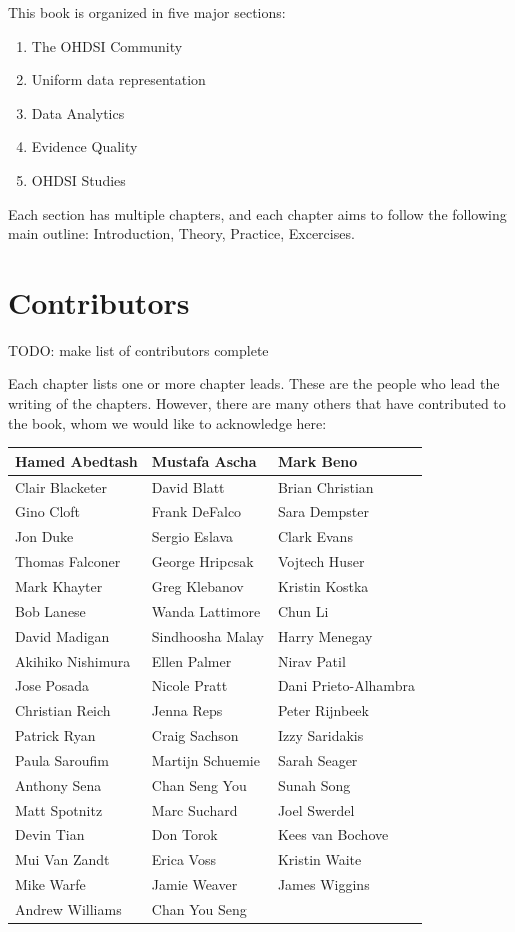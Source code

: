 \documentclass[11pt]{book}
\providecommand{\tightlist}{%
  \setlength{\itemsep}{0pt}\setlength{\parskip}{0pt}}
\theoremstyle{definition}
\theoremstyle{definition}
\theoremstyle{definition}
\theoremstyle{remark}
\begin{document}
This book is organized in five major sections:

\begin{enumerate}
\def\labelenumi{\Roman{enumi})}
\tightlist
\item
  The OHDSI Community
\item
  Uniform data representation
\item
  Data Analytics
\item
  Evidence Quality
\item
  OHDSI Studies
\end{enumerate}

Each section has multiple chapters, and each chapter aims to follow the following main outline: Introduction, Theory, Practice, Excercises.

\hypertarget{contributors}{%
\section*{Contributors}\label{contributors}}

TODO: make list of contributors complete

Each chapter lists one or more chapter leads. These are the people who lead the writing of the chapters. However, there are many others that have contributed to the book, whom we would like to acknowledge here:

\begin{tabular}{l|l|l}
\hline
Hamed Abedtash & Mustafa Ascha & Mark Beno\\
\hline
Clair Blacketer & David Blatt & Brian Christian\\
\hline
Gino Cloft & Frank DeFalco & Sara Dempster\\
\hline
Jon Duke & Sergio Eslava & Clark Evans\\
\hline
Thomas Falconer & George Hripcsak & Vojtech Huser\\
\hline
Mark Khayter & Greg Klebanov & Kristin Kostka\\
\hline
Bob Lanese & Wanda Lattimore & Chun Li\\
\hline
David Madigan & Sindhoosha Malay & Harry Menegay\\
\hline
Akihiko Nishimura & Ellen Palmer & Nirav Patil\\
\hline
Jose Posada & Nicole Pratt & Dani Prieto-Alhambra\\
\hline
Christian Reich & Jenna Reps & Peter Rijnbeek\\
\hline
Patrick Ryan & Craig Sachson & Izzy Saridakis\\
\hline
Paula Saroufim & Martijn Schuemie & Sarah Seager\\
\hline
Anthony Sena & Chan Seng You & Sunah Song\\
\hline
Matt Spotnitz & Marc Suchard & Joel Swerdel\\
\hline
Devin Tian & Don Torok & Kees van Bochove\\
\hline
Mui Van Zandt & Erica Voss & Kristin Waite\\
\hline
Mike Warfe & Jamie Weaver & James Wiggins\\
\hline
Andrew Williams & Chan You Seng & \\
\hline
\end{tabular}
\end{document}
